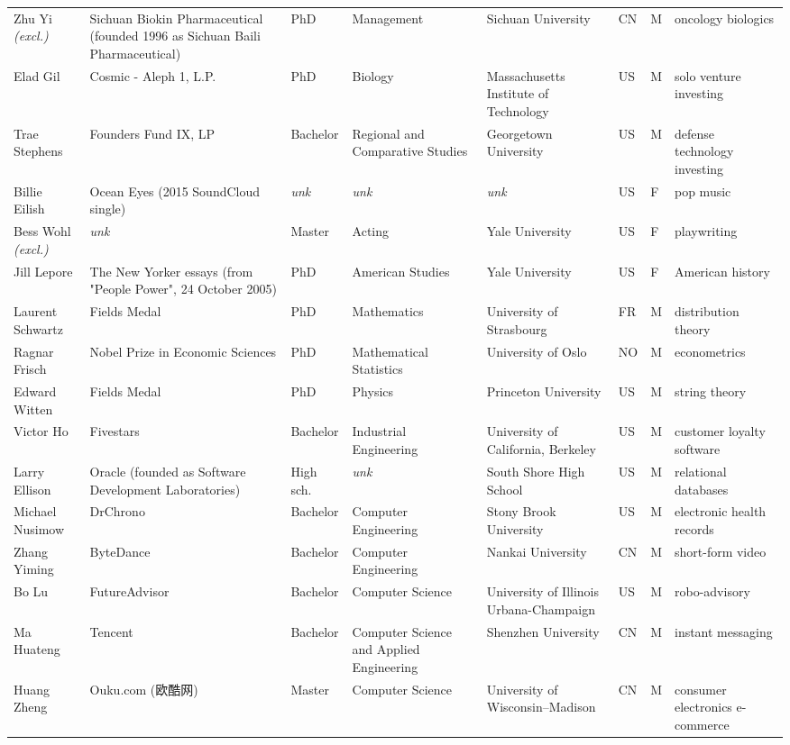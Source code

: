 \documentclass[11pt]{article}
\begin{document}
\begin{longtable}{@{}p{2.4cm}p{2.5cm}p{1.35cm}p{1.9cm}p{2.1cm}p{0.5cm}p{0.45cm}p{2.2cm}@{}}
Zhu Yi \textit{\scriptsize(excl.)} & Sichuan Biokin Pharmaceutical (founded 1996 as Sichuan Baili Pharmaceutical) & PhD & Management & Sichuan University & CN & M & oncology biologics \\
Elad Gil & Cosmic - Aleph 1, L.P. & PhD & Biology & Massachusetts Institute of Technology & US & M & solo venture investing \\
Trae Stephens & Founders Fund IX, LP & Bachelor & Regional and Comparative Studies & Georgetown University & US & M & defense technology investing \\
Billie Eilish & Ocean Eyes (2015 SoundCloud single) & \textit{unk} & \textit{unk} & \textit{unk} & US & F & pop music \\
Bess Wohl \textit{\scriptsize(excl.)} & \textit{unk} & Master & Acting & Yale University & US & F & playwriting \\
Jill Lepore & The New Yorker essays (from "People Power", 24 October 2005) & PhD & American Studies & Yale University & US & F & American history \\
Laurent Schwartz & Fields Medal & PhD & Mathematics & University of Strasbourg & FR & M & distribution theory \\
Ragnar Frisch & Nobel Prize in Economic Sciences & PhD & Mathematical Statistics & University of Oslo & NO & M & econometrics \\
Edward Witten & Fields Medal & PhD & Physics & Princeton University & US & M & string theory \\
Victor Ho & Fivestars & Bachelor & Industrial Engineering & University of California, Berkeley & US & M & customer loyalty software \\
Larry Ellison & Oracle (founded as Software Development Laboratories) & High sch. & \textit{unk} & South Shore High School & US & M & relational databases \\
Michael Nusimow & DrChrono & Bachelor & Computer Engineering & Stony Brook University & US & M & electronic health records \\
Zhang Yiming & ByteDance & Bachelor & Computer Engineering & Nankai University & CN & M & short-form video \\
Bo Lu & FutureAdvisor & Bachelor & Computer Science & University of Illinois Urbana-Champaign & US & M & robo-advisory \\
Ma Huateng & Tencent & Bachelor & Computer Science and Applied Engineering & Shenzhen University & CN & M & instant messaging \\
Huang Zheng & Ouku.com (欧酷网) & Master & Computer Science & University of Wisconsin–Madison & CN & M & consumer electronics e-commerce \\

\end{longtable}
\end{document}
